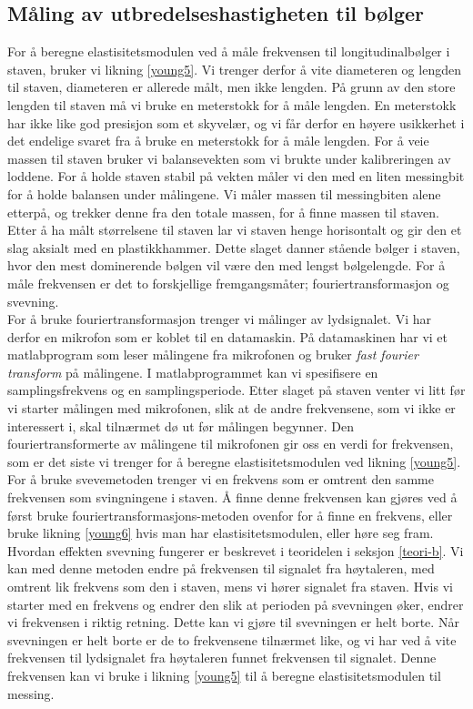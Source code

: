 \documentclass[%
 reprint,
nofootinbib,
aps,
]{revtex4-1}
\begin{document}
\subsection{Måling av utbredelseshastigheten til bølger}
For å beregne elastisitetsmodulen ved å måle frekvensen til longitudinalbølger i staven, bruker vi likning \eqref{young5}. Vi trenger derfor å vite diameteren og lengden til staven, diameteren er allerede målt, men ikke lengden. På grunn av den store lengden til staven må vi bruke en meterstokk for å måle lengden. En meterstokk har ikke like god presisjon som et skyvelær, og vi får derfor en høyere usikkerhet i det endelige svaret fra å bruke en meterstokk for å måle lengden. For å veie massen til staven bruker vi balansevekten som vi brukte under kalibreringen av loddene. For å holde staven stabil på vekten måler vi den med en liten messingbit for å holde balansen under målingene. Vi måler massen til messingbiten alene etterpå, og trekker denne fra den totale massen, for å finne massen til staven. Etter å ha målt størrelsene til staven lar vi staven henge horisontalt og gir den et slag aksialt med en plastikkhammer. Dette slaget danner stående bølger i staven, hvor den mest dominerende bølgen vil være den med lengst bølgelengde. For å måle frekvensen er det to forskjellige fremgangsmåter; fouriertransformasjon og svevning.\\ For å bruke fouriertransformasjon trenger vi målinger av lydsignalet. Vi har derfor en mikrofon som er koblet til en datamaskin. På datamaskinen har vi et matlabprogram som leser målingene fra mikrofonen og bruker \textit{fast fourier transform} på målingene. I matlabprogrammet kan vi spesifisere en samplingsfrekvens og en samplingsperiode. Etter slaget på staven venter vi litt før vi starter målingen med mikrofonen, slik at de andre frekvensene, som vi ikke er interessert i, skal tilnærmet dø ut før målingen begynner. Den fouriertransformerte av målingene til mikrofonen gir oss en verdi for frekvensen, som er det siste vi trenger for å beregne elastisitetsmodulen ved likning \eqref{young5}.\\
For å bruke svevemetoden trenger vi en frekvens som er omtrent den samme frekvensen som svingningene i staven. Å finne denne frekvensen kan gjøres ved å først bruke fouriertransformasjons-metoden ovenfor for å finne en frekvens, eller bruke likning \eqref{young6} hvis man har elastisitetsmodulen, eller høre seg fram. Hvordan effekten svevning fungerer er beskrevet i teoridelen i seksjon \vref{teori-b}. Vi kan med denne metoden endre på frekvensen til signalet fra høytaleren, med omtrent lik frekvens som den i staven, mens vi hører signalet fra staven. Hvis vi starter med en frekvens og endrer den slik at perioden på svevningen øker, endrer vi frekvensen i riktig retning. Dette kan vi gjøre til svevningen er helt borte. Når svevningen er helt borte er de to frekvensene tilnærmet like, og vi har ved å vite frekvensen til lydsignalet fra høytaleren funnet frekvensen til signalet. Denne frekvensen kan vi bruke i likning \eqref{young5} til å beregne elastisitetsmodulen til messing.
\end{document}

